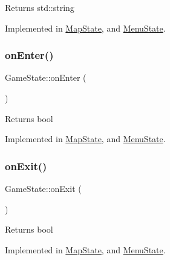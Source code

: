 \begin{DoxyReturn}{Returns}
std\+::string 
\end{DoxyReturn}


Implemented in \mbox{\hyperlink{class_map_state_a0434e96d8a597fe7f5cbc6205e4b8f85}{Map\+State}}, and \mbox{\hyperlink{class_menu_state_a96131ebc632546458ccf8034f87a692b}{Menu\+State}}.

\mbox{\label{class_game_state_ac9dd3f269dda278d57d9a1e3e27461da}} 
\subsubsection{\texorpdfstring{onEnter()}{onEnter()}}
{\footnotesize\ttfamily Game\+State\+::on\+Enter (\begin{DoxyParamCaption}{ }\end{DoxyParamCaption})\hspace{0.3cm}{\ttfamily [pure virtual]}}

\begin{DoxyReturn}{Returns}
bool 
\end{DoxyReturn}


Implemented in \mbox{\hyperlink{class_map_state_aa0a860d4f4c09fa6f7da28a243b1fc37}{Map\+State}}, and \mbox{\hyperlink{class_menu_state_a1c825d87d75a552440e0fc54a4428359}{Menu\+State}}.

\mbox{\label{class_game_state_a17db45d86c52f063cfc854f8ba062178}} 
\subsubsection{\texorpdfstring{onExit()}{onExit()}}
{\footnotesize\ttfamily Game\+State\+::on\+Exit (\begin{DoxyParamCaption}{ }\end{DoxyParamCaption})\hspace{0.3cm}{\ttfamily [pure virtual]}}

\begin{DoxyReturn}{Returns}
bool 
\end{DoxyReturn}


Implemented in \mbox{\hyperlink{class_map_state_ab2daa5de8a62640f5373ce69315aac93}{Map\+State}}, and \mbox{\hyperlink{class_menu_state_aae03dc2a5d860a3a1a2ea946cd3309a5}{Menu\+State}}.

